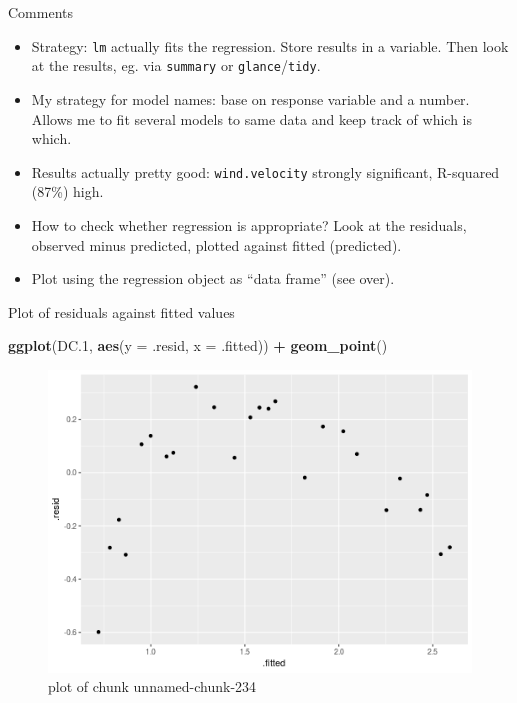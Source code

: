 \documentclass[ignorenonframetext,]{beamer}
\newenvironment{Shaded}{\begin{snugshade}}{\end{snugshade}}
\newcommand{\DataTypeTok}[1]{\textcolor[rgb]{0.13,0.29,0.53}{#1}}
\newcommand{\FloatTok}[1]{\textcolor[rgb]{0.00,0.00,0.81}{#1}}
\newcommand{\KeywordTok}[1]{\textcolor[rgb]{0.13,0.29,0.53}{\textbf{#1}}}
\newcommand{\NormalTok}[1]{#1}
\newcommand{\OperatorTok}[1]{\textcolor[rgb]{0.81,0.36,0.00}{\textbf{#1}}}
\newcommand{\StringTok}[1]{\textcolor[rgb]{0.31,0.60,0.02}{#1}}
\providecommand{\tightlist}{%
  \setlength{\itemsep}{0pt}\setlength{\parskip}{0pt}}
\begin{document}
\begin{frame}[fragile]{Comments}
\protect\hypertarget{comments-11}{}

\begin{itemize}
\tightlist
\item
  Strategy: \texttt{lm} actually fits the regression. Store results in a
  variable. Then look at the results, eg. via \texttt{summary} or
  \texttt{glance}/\texttt{tidy}.
\item
  My strategy for model names: base on response variable and a number.
  Allows me to fit several models to same data and keep track of which
  is which.
\item
  Results actually pretty good: \texttt{wind.velocity} strongly
  significant, R-squared (87\%) high.
\item
  How to check whether regression is appropriate? Look at the residuals,
  observed minus predicted, plotted against fitted (predicted).
\item
  Plot using the regression object as ``data frame'' (see over).
\end{itemize}

\end{frame}

\begin{frame}[fragile]{Plot of residuals against fitted values}
\protect\hypertarget{plot-of-residuals-against-fitted-values}{}

\begin{Shaded}
\begin{Highlighting}[]
\KeywordTok{ggplot}\NormalTok{(DC}\FloatTok{.1}\NormalTok{, }\KeywordTok{aes}\NormalTok{(}\DataTypeTok{y =}\NormalTok{ .resid, }\DataTypeTok{x =}\NormalTok{ .fitted)) }\OperatorTok{+}\StringTok{ }\KeywordTok{geom_point}\NormalTok{()}
\end{Highlighting}
\end{Shaded}

\begin{figure}
\centering
\includegraphics{figure/unnamed-chunk-234-1.png}
\caption{plot of chunk unnamed-chunk-234}
\end{figure}

\end{frame}
\end{document}

